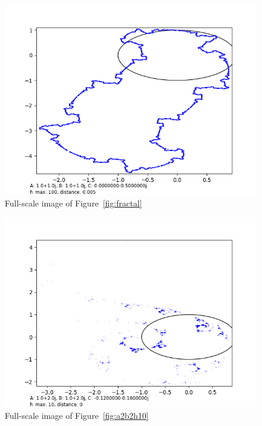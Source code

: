 \documentclass[12pt,a4paper,reqno,parskip=full]{amsart}
\numberwithin{equation}{section}
\theoremstyle{plain}
\theoremstyle{definition}
\begin{document}
\begin{figure}[H]
    \centering
    \includegraphics[width=\textwidth]{images/m/a1,b1,h100,d.005.png}
    \caption{Full-scale image of Figure~\ref{fig:fractal}}
\end{figure}

\begin{figure}[H]
    \centering
    \includegraphics[width=\textwidth]{images/a2b2/a2,b2,h10,d0.png}
    \caption{Full-scale image of Figure~\ref{fig:a2b2h10}}
\end{figure}
\end{document}
